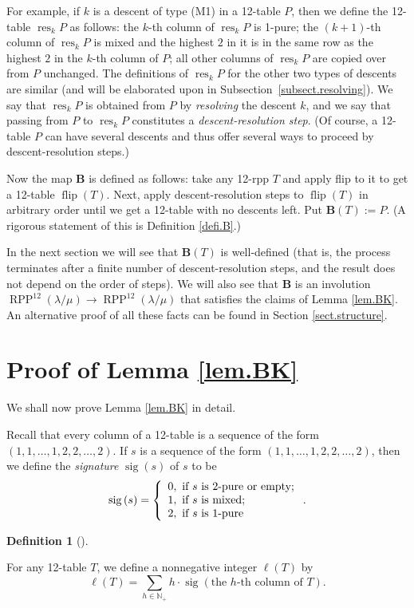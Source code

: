 \documentclass[numbers=enddot,12pt,final,onecolumn,notitlepage]{scrartcl}%
\theoremstyle{definition}
\newtheorem{defi}[theo]{Definition}
\newenvironment{definition}[1][]
{\begin{defi}[#1]\begin{leftbar}}
{\end{leftbar}\end{defi}}
\let\sumnonlimits\sum
\renewcommand{\sum}{\sumnonlimits\limits}
\def\B{{\mathbf{B}}}
\def\OneTwoRPP{{\operatorname{RPP}^{12}\left(  \lambda/\mu\right)}}
\def\flip{{\operatorname{flip}}}
\begin{document}
\def\resk{{\operatorname{res}_{k}}}

For example, if $k$ is a descent of type (M1) in a 12-table $P$, then we define the 12-table $\resk P$ as follows: the $k$-th column of $\resk P$ is 1-pure; the $\left(  k+1\right)  $-th column of $\resk P$ is mixed and the highest $2$ in it is in the same row as the highest $2$ in the $k$-th column of $P$; all other columns of $\resk P$ are
copied over from $P$ unchanged. The definitions of $\resk P$ for the other two types of descents are similar (and will be elaborated upon in Subsection~\ref{subsect.resolving}). We say that $\resk P$ is obtained from $P$ by \textit{resolving} the descent $k$, and we say that passing from $P$ to $\resk P$ constitutes a \textit{descent-resolution step}. (Of course, a 12-table $P$ can have several descents and thus offer several ways to proceed by descent-resolution steps.)

Now the map $\B$ is defined as follows: take any 12-rpp $T$ and apply flip to it to get a 12-table $\flip(T)$. Next, apply descent-resolution steps to $\flip(T)$ in arbitrary order until we get a 12-table with no descents left. Put $\B(T):=P$. (A rigorous statement of this is Definition \ref{defi.B}.)

In the next section we will see that $\B(T)$ is well-defined (that is, the process terminates after a finite number of descent-resolution steps, and the result does not depend on the order of steps). We will also see that $\B$ is an involution $\OneTwoRPP\to\OneTwoRPP$ that satisfies the claims of Lemma \ref{lem.BK}. An alternative proof of all these facts can be found in Section \ref{sect.structure}.



\section{\label{sect.proof}Proof of Lemma \ref{lem.BK}}

We shall now prove Lemma \ref{lem.BK} in detail.

Recall that every column of a 12-table
is a sequence of the form $(1,1,\ldots,1,2,2,\ldots,2)$. If $s$ is a sequence of the form $(1,1,\ldots,1,2,2,\ldots,2)$, then we define the
\textit{signature} $\operatorname*{sig}\left(  s\right)
$ of $s$ to be
\[
\operatorname*{sig}\left(  s\right) = \left\{
\begin{array}
[c]{l}%
0,\text{ if }s\text{ is 2-pure or empty;}\\
1,\text{ if }s\text{ is mixed;}\\
2,\text{ if }s\text{ is 1-pure}%
\end{array}
\right.
.
\]
\begin{definition}
 \label{defi.fourtypes}
For any 12-table $T$, we define a nonnegative integer $\ell\left(
T\right)  $ by%
\[
\ell\left(  T\right)  =\sum_{h\in\mathbb{N}_{+}}h\cdot\operatorname*{sig}%
\left(  \text{the }h\text{-th column of }T\right)  .
\]
\end{definition}
\end{document}
